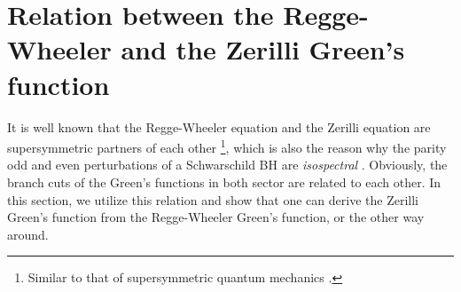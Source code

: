 \documentclass[reprint,aps,physrev,superscriptaddress,10pt,notitlepage,prd,nofootinbib,onecolumn]{revtex4-2}
\begin{document}
\section{Relation between the Regge-Wheeler and the Zerilli Green's function}
\label{sec:darboux_transform}
It is well known that the Regge-Wheeler equation and the Zerilli equation are supersymmetric partners of each other \footnote{Similar to that of supersymmetric quantum mechanics \cite{Cooper:1994eh}.}, which is also the reason why the parity odd and even perturbations of a Schwarschild BH are {\it isospectral} \cite{Chandrasekhar:1975zza}. Obviously, the branch cuts of the Green's functions in both sector are related to each other. In this section, we utilize this relation and show that one can derive the Zerilli Green's function from the Regge-Wheeler Green's function, or the other way around. 
\end{document}
